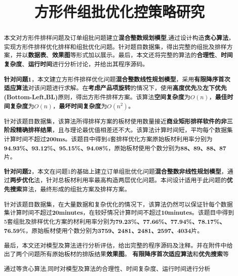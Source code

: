 \documentclass[bwprint]{gmcmthesis}
\title{方形件组批优化控策略研究}
\begin{document}
\sloppy

 \maketitle

\begin{abstract}
本文对方形件排样问题及订单组批问题建立\textbf{混合整数规划模型},通过设计构造\textbf{贪心算法}，实现方形件排样优化排样和组批优化问题。针对题目数据集，得出完整的组批及排样方案，并以\textbf{数据表}、\textbf{效果图}等形式加以展示。最后，本文还将完整的算法的\textbf{合理性}、\textbf{时间复杂度}、\textbf{运行时间}进行分析讨论，并给出其程序源码。

\textbf{针对问题1}，本文建立方形件排样优化问题\textbf{混合整数线性规划模型}，采用\textbf{有限降序首次适应算法}对该问题进行求解。在\textbf{考虑产品项旋转}的情况下，使用\textbf{高度优先}及\textbf{左下优先(Bottom-Left,BL)}原则，得出方形件排样方案。该算法\textbf{空间复杂度}为$O(n)$，\textbf{最佳时间复杂度}为$O(n)$，\textbf{最坏时间复杂度}为$O(n^2)$。

针对该题目数据集，该算法所得排样方案的板材使用数量接近\textbf{商业矩形排样软件的非三阶段精确排样结果}，且与理论最优值相差还不大。该算法计算时间短，平均每个数据集计算时间不超过\textbf{200ms}。该题目中得到4套排样优化方案原始板材利用率分别为\textbf{94.93\%、93.12\%、95.15\%、94.08\%}，原始板材使用个数分别为\textbf{88、89、88、87}片。

\textbf{针对问题2}，本文在问题1的基础上建立订单组批优化问题\textbf{混合整数非线性规划模型}，通过\textbf{两步优化}法，针对总板材利用率最高构造两层优化问题。本问设计适用于此问题的\textbf{优先搜索}算法，最终形成的组批方案及排样方案。

针对该题目数据集，在大量数据和复杂优化的情况下，该算法仍然可以保证针每个数据集计算时间不超过\textbf{20minutes}，在较好情况计算时间不超过\textbf{10minutes}。该题目中得到5套组批及排样优化方案的材利用率分别为\textbf{79.23\%、77.66\%、77.94\%、78.17\%、76.59\%}，原始板材使用个数分别为\textbf{3759、2481、2481、2597、4034}片。

最后，本文还对模型及算法进行分析评估，给出完整的程序源码及注释。并在附件中给出了两个问题所有原始板材的排版结果\textbf{效果图}。
\textbf{有限降序首次适应算法}和\textbf{优先搜索}等

通过等贪心算法,同时对模型及算法的合理性、时间复杂度、运行时间进行分析
\end{abstract}

\end{document}
